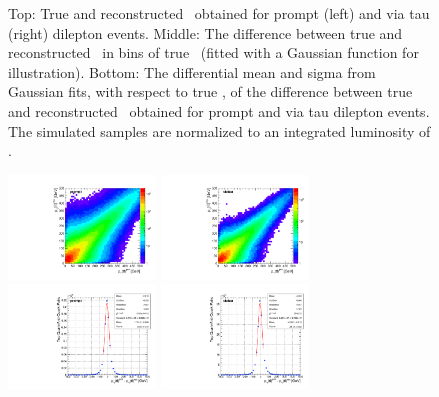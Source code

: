 \begin{figure}
\begin{center}
    \caption{\small Top: True and reconstructed \mtt\ obtained for prompt (left) and via tau (right) \ttbar dilepton events.
    Middle: The difference between true and reconstructed \mtt\ in bins of true \mtt\ (fitted with a Gaussian function for illustration).
    Bottom: The differential mean and sigma from Gaussian fits, with respect to true \mtt, of the difference between true and reconstructed \mtt\ obtained for prompt and via tau \ttbar dilepton events.
    The simulated samples are normalized to an integrated luminosity of \lumivalueRuniiUL.}
    \label{fig:kinrec:resolution-mtt}
 \end{center}
\end{figure}

\begin{figure}
  \begin{center}
    \includegraphics[width=0.35\textwidth]{fig_fullRun2UL/KinRecoResolutions/ttbar_pT_genreco_prompt.pdf}
    \includegraphics[width=0.35\textwidth]{fig_fullRun2UL/KinRecoResolutions/ttbar_pT_genreco_viatau.pdf}\\
    \includegraphics[width=0.35\textwidth]{fig_fullRun2UL/KinRecoResolutions/ttbar_pT_residual_prompt.pdf}
    \includegraphics[width=0.35\textwidth]{fig_fullRun2UL/KinRecoResolutions/ttbar_pT_residual_viatau.pdf}\\

\end{center}
\end{figure}
